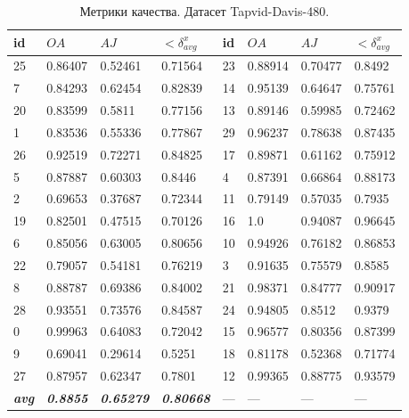 \documentclass[a4paper, 14pt]{extarticle}
\theoremstyle{definition}
\theoremstyle{plain}
\theoremstyle{remark}
\begin{document}
\begin{table}[!ht]
    \centering
    \begin{tabular}{|l|l|l|l || l|l|l|l|}
    \hline
	\textbf{id} & \textbf{$OA$} & \textbf{$AJ$} & \textbf{$<\delta^x_{avg}$} & \textbf{id} & \textbf{$OA$} & \textbf{$AJ$} & \textbf{$<\delta^x_{avg}$} \\ \hline
        25 & 0.86407 & 0.52461 & 0.71564 & 23 & 0.88914 & 0.70477 & 0.8492 \\ \hline
        7 & 0.84293 & 0.62454 & 0.82839 & 14 & 0.95139 & 0.64647 & 0.75761 \\ \hline
        20 & 0.83599 & 0.5811 & 0.77156 & 13 & 0.89146 & 0.59985 & 0.72462 \\ \hline
        1 & 0.83536 & 0.55336 & 0.77867 & 29 & 0.96237 & 0.78638 & 0.87435 \\ \hline
        26 & 0.92519 & 0.72271 & 0.84825 & 17 & 0.89871 & 0.61162 & 0.75912 \\ \hline
        5 & 0.87887 & 0.60303 & 0.8446 & 4 & 0.87391 & 0.66864 & 0.88173 \\ \hline
        2 & 0.69653 & 0.37687 & 0.72344 & 11 & 0.79149 & 0.57035 & 0.7935 \\ \hline
        19 & 0.82501 & 0.47515 & 0.70126 & 16 & 1.0 & 0.94087 & 0.96645 \\ \hline
        6 & 0.85056 & 0.63005 & 0.80656 & 10 & 0.94926 & 0.76182 & 0.86853 \\ \hline
        22 & 0.79057 & 0.54181 & 0.76219 & 3 & 0.91635 & 0.75579 & 0.8585 \\ \hline
        8 & 0.88787 & 0.69386 & 0.84002 & 21 & 0.98371 & 0.84777 & 0.90917 \\ \hline
        28 & 0.93551 & 0.73576 & 0.84587 & 24 & 0.94805 & 0.8512 & 0.9379 \\ \hline
        0 & 0.99963 & 0.64083 & 0.72042 & 15 & 0.96577 & 0.80356 & 0.87399 \\ \hline
        9 & 0.69041 & 0.29614 & 0.5251 & 18 & 0.81178 & 0.52368 & 0.71774 \\ \hline
        27 & 0.87957 & 0.62347 & 0.7801 & 12 & 0.99365 & 0.88775 & 0.93579  \\ \hline
        \hline
        \textit{\textbf{avg}} & \textit{\textbf{0.8855} }& \textit{\textbf{0.65279}} & \textit{\textbf{0.80668}} & --- & --- & --- & --- \\ \hline
    \end{tabular}
	\caption{Метрики качества. Датасет Tapvid-Davis-480.}
\end{table}
\end{document}
